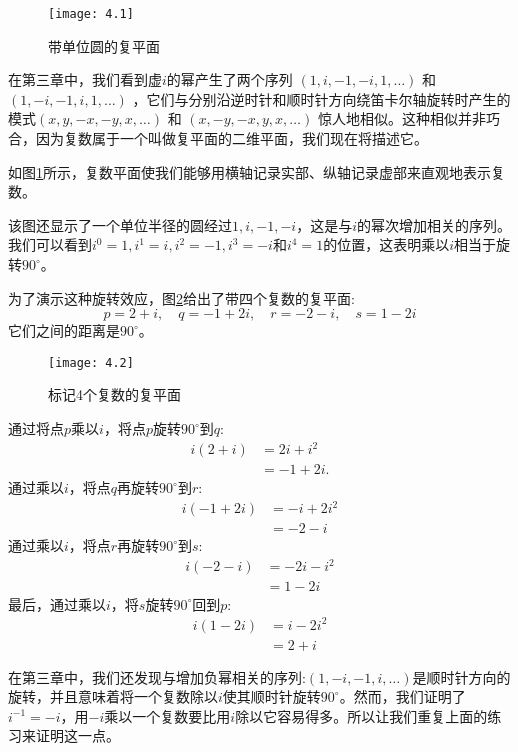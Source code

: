 \begin{figure}[htbp]
    \centering
    \texttt{[image: 4.1]}
    \caption[short]{带单位圆的复平面}
    \label{fig:4.1}
\end{figure}

在第三章中，我们看到虚$i$的幂产生了两个序列 $(1, i,-1,-i, 1, \ldots)$ 和 $(1,-i,-1, i, 1, \ldots)$ ，它们与分别沿逆时针和顺时针方向绕笛卡尔轴旋转时产生的模式$(x, y,-x,-y, x, \ldots)$ 和 $(x,-y,-x, y, x, \ldots)$ 惊人地相似。这种相似并非巧合，因为复数属于一个叫做复平面的二维平面，我们现在将描述它。

如图\ref{fig:4.1}所示，复数平面使我们能够用横轴记录实部、纵轴记录虚部来直观地表示复数。

该图还显示了一个单位半径的圆经过$1, i,-1,-i$，这是与$i$的幂次增加相关的序列。我们可以看到$i^{0}=1, i^{1}=i, i^{2}=-1, i^{3}=-i$和$i^{4}=1$的位置，这表明乘以$i$相当于旋转$90^{\circ}$。

为了演示这种旋转效应，图\ref{fig:4.2}给出了带四个复数的复平面:
$$
    p=2+i, \quad q=-1+2 i, \quad r=-2-i, \quad s=1-2 i
$$
它们之间的距离是$90^{\circ}$。
\begin{figure}[htbp]
    \centering
    \texttt{[image: 4.2]}
    \caption[short]{标记4个复数的复平面}
    \label{fig:4.2}
\end{figure}

通过将点$p$乘以$i$，将点$p$旋转$90^{\circ}$到$q$:
$$
    \begin{aligned}
        i(2+i) & =2 i+i^{2} \\
               & =-1+2 i .
    \end{aligned}
$$
通过乘以$i$，将点$q$再旋转$90^{\circ}$到$r$:
$$
    \begin{aligned}
        i(-1+2 i) & =-i+2 i^{2} \\
                  & =-2-i
    \end{aligned}
$$
通过乘以$i$，将点$r$再旋转$90^{\circ}$到$s$:
$$
    \begin{aligned}
        i(-2-i) & =-2 i-i^{2} \\
                & =1-2 i
    \end{aligned}
$$
最后，通过乘以$i$，将$s$旋转$90^{\circ}$回到$p$:
$$
    \begin{aligned}
        i(1-2 i) & =i-2 i^{2} \\
                 & =2+i
    \end{aligned}
$$

在第三章中，我们还发现与增加负幂相关的序列:$(1,-i,-1, i, \ldots)$是顺时针方向的旋转，并且意味着将一个复数除以$i$使其顺时针旋转$90^{\circ}$。然而，我们证明了$i^{-1}=-i$，用$-i$乘以一个复数要比用$i$除以它容易得多。所以让我们重复上面的练习来证明这一点。

